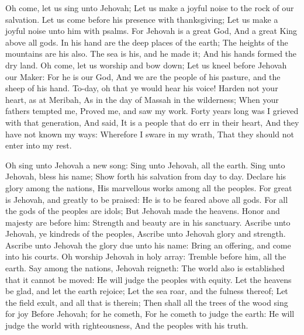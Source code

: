 Oh come, let us sing unto Jehovah; Let us make a joyful noise to the rock of our salvation.  Let us come before his presence with thanksgiving; Let us make a joyful noise unto him with psalms.  For Jehovah is a great God, And a great King above all gods.  In his hand are the deep places of the earth; The heights of the mountains are his also.  The sea is his, and he made it; And his hands formed the dry land.  Oh come, let us worship and bow down; Let us kneel before Jehovah our Maker:  For he is our God, And we are the people of his pasture, and the sheep of his hand. To-day, oh that ye would hear his voice!  Harden not your heart, as at Meribah, As in the day of Massah in the wilderness;  When your fathers tempted me, Proved me, and saw my work.  Forty years long was I grieved with that generation, And said, It is a people that do err in their heart, And they have not known my ways:  Wherefore I sware in my wrath, That they should not enter into my rest. 

Oh sing unto Jehovah a new song: Sing unto Jehovah, all the earth.  Sing unto Jehovah, bless his name; Show forth his salvation from day to day.  Declare his glory among the nations, His marvellous works among all the peoples.  For great is Jehovah, and greatly to be praised: He is to be feared above all gods.  For all the gods of the peoples are idols; But Jehovah made the heavens.  Honor and majesty are before him: Strength and beauty are in his sanctuary.  Ascribe unto Jehovah, ye kindreds of the peoples, Ascribe unto Jehovah glory and strength.  Ascribe unto Jehovah the glory due unto his name: Bring an offering, and come into his courts.  Oh worship Jehovah in holy array: Tremble before him, all the earth.  Say among the nations, Jehovah reigneth: The world also is established that it cannot be moved: He will judge the peoples with equity.  Let the heavens be glad, and let the earth rejoice; Let the sea roar, and the fulness thereof;  Let the field exult, and all that is therein; Then shall all the trees of the wood sing for joy  Before Jehovah; for he cometh, For he cometh to judge the earth: He will judge the world with righteousness, And the peoples with his truth. 

